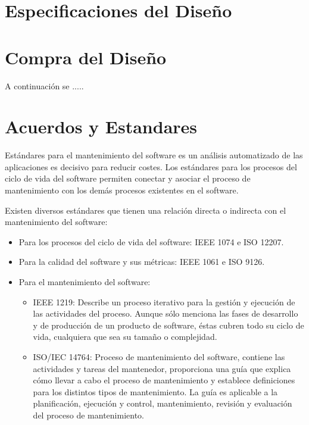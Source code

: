 

\section{Especificaciones del Diseño}



\section{Compra del Diseño}

A continuaci\'on se .....

\section{Acuerdos y Estandares}

Est\'andares para el mantenimiento del software es un an\'alisis automatizado de las aplicaciones es decisivo para reducir costes. Los est\'andares para los procesos del ciclo de vida del software permiten conectar y asociar el proceso de mantenimiento con los dem\'as procesos existentes en el software.

Existen diversos est\'andares que tienen una relaci\'on directa o indirecta con el mantenimiento del software:
\begin{itemize}
\item Para los procesos del ciclo de vida del software: IEEE 1074 e ISO 12207.
\item Para la calidad del software y sus m\'etricas: IEEE 1061 e ISO 9126.

\item Para el mantenimiento del software: 
\begin{itemize}
\item IEEE 1219: Describe un proceso iterativo para la gesti\'on y ejecuci\'on de las actividades del proceso. Aunque s\'olo menciona las fases de desarrollo y de producci\'on de un producto de software, \'estas cubren todo su ciclo de vida, cualquiera que sea su tama\~no o complejidad.
 
\item ISO/IEC 14764: Proceso de mantenimiento del software, contiene las actividades y tareas del mantenedor, proporciona una gu\'ia que explica c\'omo llevar a cabo el proceso de mantenimiento y establece definiciones para los distintos tipos de mantenimiento. La gu\'ia es aplicable a la planificaci\'on, ejecuci\'on y control, mantenimiento, revisi\'on y evaluaci\'on del proceso de mantenimiento.
\end{itemize}
\end{itemize}




